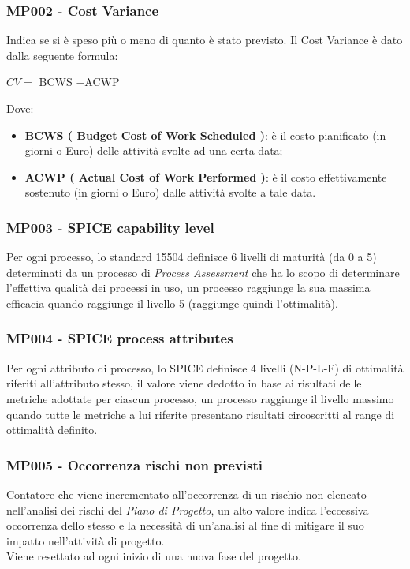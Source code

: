 \subsubsection{MP002 - Cost  Variance }
Indica se si è speso più o meno di quanto è stato previsto.
Il Cost Variance è dato dalla seguente formula:\\
\begin{center}
	$CV = ${ BCWS} $-${ACWP}
\end{center}
Dove:
\begin{itemize}
	\item \textbf{ BCWS ( Budget Cost of Work Scheduled )}: è il costo pianificato (in giorni o Euro) delle attività svolte ad una certa data; 
	\item \textbf{ ACWP ( Actual Cost of Work Performed )}: è il costo effettivamente sostenuto (in giorni o Euro) dalle attività svolte a tale data.
\end{itemize}

\subsubsection{MP003 - SPICE capability level}
Per ogni processo, lo standard 15504 definisce 6 livelli di maturità (da 0 a 5) determinati da un processo di \textit{Process Assessment} che ha lo scopo di determinare l'effettiva qualità dei processi in uso, un processo raggiunge la sua massima efficacia quando raggiunge il livello 5 (raggiunge quindi l'ottimalità).

\subsubsection{MP004 - SPICE process attributes}
Per ogni attributo di processo, lo SPICE definisce 4 livelli (N-P-L-F) di ottimalità riferiti all'attributo stesso, il valore viene dedotto in base ai risultati delle metriche adottate per ciascun processo, un processo raggiunge il livello massimo quando tutte le metriche a lui riferite presentano risultati circoscritti al range di ottimalità definito.

\subsubsection{MP005 - Occorrenza rischi non previsti}
Contatore che viene incrementato all'occorrenza di un rischio non elencato nell'analisi dei rischi del \textit{Piano di Progetto}, un alto valore indica l'eccessiva occorrenza dello stesso e la necessità di un'analisi al fine di mitigare il suo impatto nell'attività di progetto.\\
Viene resettato ad ogni inizio di una nuova fase del progetto.

